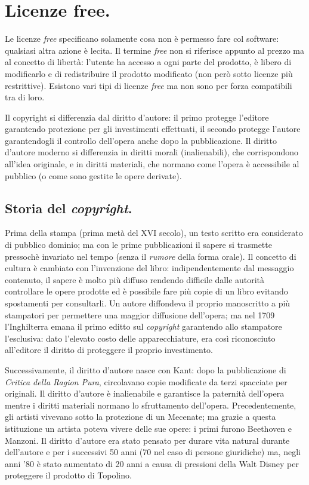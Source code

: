 \documentclass[a4page, 11pt, twocolumn]{article}
\begin{document}
\section{Licenze free.}
Le licenze \textit{free} specificano solamente cosa non è permesso fare col software: qualsiasi altra azione è lecita.
Il termine \textit{free} non si riferisce appunto al prezzo ma al concetto di libertà: l'utente ha accesso a ogni parte del prodotto, è libero di modificarlo e di redistribuire il prodotto modificato (non però sotto licenze più restrittive).
Esistono vari tipi di licenze \textit{free} ma non sono per forza compatibili tra di loro.

Il copyright si differenzia dal diritto d'autore: il primo protegge l'editore garantendo protezione per gli investimenti effettuati, il secondo protegge l'autore garantendogli il controllo dell'opera anche dopo la pubblicazione.
Il diritto d'autore moderno si differenzia in diritti morali (inalienabili), che corrispondono all'idea originale, e in diritti materiali, che normano come l'opera è accessibile al pubblico (o come sono gestite le opere derivate).

\subsection{Storia del \textit{copyright}.}
Prima della stampa (prima metà del XVI secolo), un testo scritto era considerato di pubblico dominio; ma con le prime pubblicazioni il sapere si trasmette pressochè invariato nel tempo (senza il \textit{rumore} della forma orale).
Il concetto di cultura è cambiato con l'invenzione del libro: indipendentemente dal messaggio contenuto, il sapere è molto più diffuso rendendo difficile dalle autorità controllare le opere prodotte ed è possibile fare più copie di un libro evitando spostamenti per consultarli.
Un autore diffondeva il proprio manoscritto a più stampatori per permettere una maggior diffusione dell'opera; ma nel 1709 l'Inghilterra emana il primo editto sul \textit{copyright} garantendo allo stampatore l'esclusiva: dato l'elevato costo delle apparecchiature, era così riconosciuto all'editore il diritto di proteggere il proprio investimento.

Successivamente, il diritto d'autore nasce con Kant: dopo la pubblicazione di \textit{Critica della Ragion Pura}, circolavano copie modificate da terzi spacciate per originali.
Il diritto d'autore è inalienabile e garantisce la paternità dell'opera mentre i diritti materiali normano lo sfruttamento dell'opera. \newline
Precedentemente, gli artisti vivevano sotto la protezione di un Mecenate; ma grazie a questa istituzione un artista poteva vivere delle sue opere: i primi furono Beethoven e Manzoni.
Il diritto d'autore era stato pensato per durare vita natural durante dell'autore e per i successivi 50 anni (70 nel caso di persone giuridiche) ma, negli anni '80 è stato aumentato di 20 anni a causa di pressioni della Walt Disney per proteggere il prodotto di Topolino.
\end{document}
